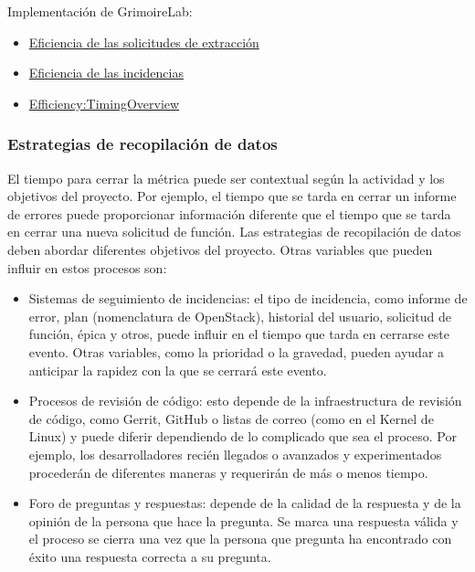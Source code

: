 Implementación de GrimoireLab:

\begin{itemize}
\tightlist
\item
  \href{https://chaoss.github.io/grimoirelab-sigils/panels/github-pullrequests-efficiency/}{Eficiencia
  de las solicitudes de extracción}
\item
  \href{https://chaoss.github.io/grimoirelab-sigils/panels/github-issues-efficiency/}{Eficiencia
  de las incidencias}
\item
  \href{https://chaoss.github.io/grimoirelab-sigils/panels/efficiency-timing-overview/}{Efficiency:TimingOverview}
\end{itemize}

\hypertarget{estrategias-de-recopilaciuxf3n-de-datos}{%
\subsubsection{Estrategias de recopilación de
datos}\label{estrategias-de-recopilaciuxf3n-de-datos}}

El tiempo para cerrar la métrica puede ser contextual según la actividad
y los objetivos del proyecto. Por ejemplo, el tiempo que se tarda en
cerrar un informe de errores puede proporcionar información diferente
que el tiempo que se tarda en cerrar una nueva solicitud de función. Las
estrategias de recopilación de datos deben abordar diferentes objetivos
del proyecto. Otras variables que pueden influir en estos procesos son:

\begin{itemize}
\tightlist
\item
  Sistemas de seguimiento de incidencias: el tipo de incidencia, como
  informe de error, plan (nomenclatura de OpenStack), historial del
  usuario, solicitud de función, épica y otros, puede influir en el
  tiempo que tarda en cerrarse este evento. Otras variables, como la
  prioridad o la gravedad, pueden ayudar a anticipar la rapidez con la
  que se cerrará este evento.
\item
  Procesos de revisión de código: esto depende de la infraestructura de
  revisión de código, como Gerrit, GitHub o listas de correo (como en el
  Kernel de Linux) y puede diferir dependiendo de lo complicado que sea
  el proceso. Por ejemplo, los desarrolladores recién llegados o
  avanzados y experimentados procederán de diferentes maneras y
  requerirán de más o menos tiempo.
\item
  Foro de preguntas y respuestas: depende de la calidad de la respuesta
  y de la opinión de la persona que hace la pregunta. Se marca una
  respuesta válida y el proceso se cierra una vez que la persona que
  pregunta ha encontrado con éxito una respuesta correcta a su pregunta.
\end{itemize}

